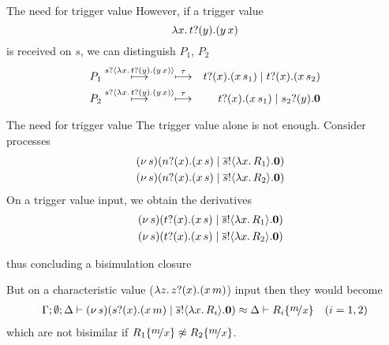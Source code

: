 \documentclass{beamer}
\begin{document}
	\begin{frame}{The need for trigger value}
		However, if a trigger value
		\[
			\lambda {x}.\,t ? (y) . (y\, {{x}})
		\]
		is received on $s$, we can distinguish $P_1$, $P_2$ %
		\begin{eqnarray*}
			P_1 &\stackrel{s ? \langle \lambda {x}.\,t ? (y) . (y\, {{x}}) \rangle}{\longmapsto} \stackrel{\tau}{\longmapsto}& t ? (x) . (x\, {s_1}) \;|\; t ? (x) . (x\, {s_2})\\
			P_2 &\stackrel{s ? \langle \lambda {x}.\,t ? (y) . (y\, {{x}}) \rangle}{\longmapsto} \stackrel{\tau}{\longmapsto}& t ? (x) . (x\, {s_1}) \;|\; s_2 ? (y) . \mathbf{0}
		\end{eqnarray*}
	\end{frame}

	\begin{frame}{The need for trigger value}
		The trigger value alone is not enough.
		Consider processes
		\begin{eqnarray*}
			&&(\nu\, s)(n ? (x) . (x\, {s}) \;|\; \overline{s} ! \langle \lambda x.\,R_1 \rangle . \mathbf{0}) \\
			&&(\nu\, s)(n ? (x) . (x\, {s}) \;|\; \overline{s} ! \langle \lambda x.\,R_2 \rangle . \mathbf{0}) 
		\end{eqnarray*}
		On a trigger value input, we obtain the derivatives
		\begin{eqnarray*}
			&&(\nu\, s)(t ? (x) . (x\, {s}) \;|\; \overline{s} ! \langle \lambda x.\,R_1 \rangle . \mathbf{0}) \\
			&&(\nu\, s)(t ? (x) . (x\, {s}) \;|\; \overline{s} ! \langle \lambda x.\,R_2 \rangle . \mathbf{0})
		\end{eqnarray*}

		\noi thus concluding a bisimulation closure

		But
		on a characteristic value ($\lambda z.\,z ? (x) . (x\, {m})$) input 
		then they would become
		\begin{eqnarray*}
			\Gamma; \es; \Delta \proves \newsp{s}{\binp{s}{x} (\appl{x}{m}) \Par \bout{\dual{s}}{\abs{x} R_i} \inact} \wbc \Delta \proves R_i \subst{m}{x}
		\quad (i=1,2)
		\end{eqnarray*}
		\noi which are not bisimilar if $R_1 \subst{m}{x} \not\wbc R_2 \subst{m}{x}$.
	\end{frame}
\end{document}
